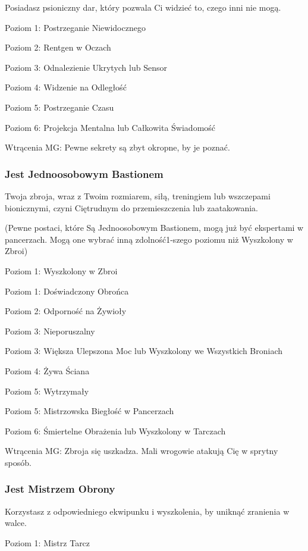 Posiadasz psioniczny dar, który  pozwala Ci widzieć to, czego inni nie mogą.

Poziom 1: Postrzeganie Niewidocznego

Poziom 2: Rentgen w Oczach

Poziom 3: Odnalezienie Ukrytych lub Sensor

Poziom 4: Widzenie na Odległość

Poziom 5: Postrzeganie Czasu

Poziom 6: Projekcja Mentalna lub Całkowita Świadomość

Wtrącenia MG: Pewne sekrety są zbyt okropne, by je poznać.

\subsubsection{Jest Jednoosobowym Bastionem}

Twoja zbroja, wraz z Twoim rozmiarem, siłą, treningiem lub wszczepami bionicznymi, czyni Ciętrudnym do przemieszczenia lub zaatakowania.

(Pewne postaci, które Są Jednoosobowym Bastionem, mogą już być ekspertami w pancerzach. Mogą one wybrać inną zdolność1-szego poziomu niż Wyszkolony w Zbroi)

Poziom 1: Wyszkolony w Zbroi

Poziom 1: Doświadczony Obrońca

Poziom 2: Odporność na Żywioły

Poziom 3: Nieporuszalny

Poziom 3: Większa Ulepszona Moc lub Wyszkolony we Wszystkich Broniach

Poziom 4: Żywa Ściana

Poziom 5: Wytrzymały

Poziom 5: Mistrzowska Biegłość w Pancerzach

Poziom 6: Śmiertelne Obrażenia lub Wyszkolony w Tarczach

Wtrącenia MG: Zbroja się uszkadza. Mali wrogowie atakują Cię w sprytny sposób. 

\subsubsection{Jest Mistrzem Obrony}

Korzystasz z odpowiedniego ekwipunku i wyszkolenia, by uniknąć zranienia w walce.

Poziom 1: Mistrz Tarcz

